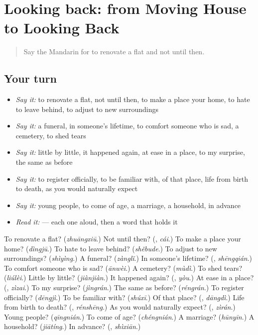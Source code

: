 \section[(dialogue)]{Looking back: from Moving House to Looking Back}

\label{lesson:ZH-R317-review-313-317}



\begin{quote}
Say the Mandarin for to renovate a flat and not until then.
\end{quote}

\subsection*{Your turn}
\begin{itemize}
\raggedright
  \item \emph{Say it:} to renovate a flat, not until then, to make a place your home, to hate to leave behind, to adjust to new surroundings
  \item \emph{Say it:} a funeral, in someone's lifetime, to comfort someone who is sad, a cemetery, to shed tears
  \item \emph{Say it:} little by little, it happened again, at ease in a place, to my surprise, the same as before
  \item \emph{Say it:} to register officially, to be familiar with, of that place, life from birth to death, as you would naturally expect
  \item \emph{Say it:} young people, to come of age, a marriage, a household, in advance
  \item \emph{Read it:}   — each one aloud, then a word that holds it
\end{itemize}

\begin{tcolorbox}[breakable,colback=teal!4,colframe=teal!35!black,title={Before you move on}]
To renovate a flat? (\emph{zhuāngxiū}.) Not until then? (\textbf{}, \emph{cái}.) To make a place your home? (\emph{dìngjū}.) To hate to leave behind? (\emph{shěbude}.) To adjust to new surroundings? (\emph{shìyìng}.) A funeral? (\emph{zànglǐ}.) In someone's lifetime? (\textbf{}, \emph{shēngqián}.) To comfort someone who is sad? (\emph{ānwèi}.) A cemetery? (\emph{mùdì}.) To shed tears? (\emph{liúlèi}.) Little by little? (\emph{jiànjiàn}.) It happened again? (\textbf{}, \emph{yòu}.) At ease in a place? (\textbf{}, \emph{zìzai}.) To my surprise? (\emph{jìngrán}.) The same as before? (\emph{réngrán}.) To register officially? (\emph{dēngjì}.) To be familiar with? (\emph{shúxī}.) Of that place? (\textbf{}, \emph{dāngdì}.) Life from birth to death? (\textbf{}, \emph{rénshēng}.) As you would naturally expect? (\textbf{}, \emph{zìrán}.) Young people? (\emph{qīngnián}.) To come of age? (\emph{chéngnián}.) A marriage? (\emph{hūnyīn}.) A household? (\emph{jiātíng}.) In advance? (\textbf{}, \emph{shìxiān}.)
\end{tcolorbox}

